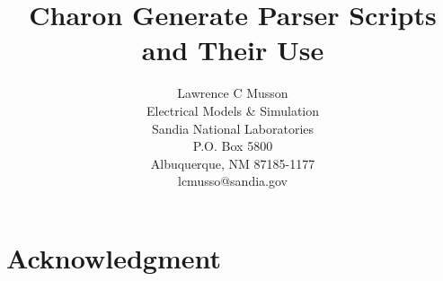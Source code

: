 \documentclass[12pt]{SANDreport}
\title{Charon Generate Parser Scripts and Their Use}
\author{Lawrence C Musson \\
	  Electrical Models \& Simulation \\
	  Sandia National Laboratories\\
	  P.O. Box 5800\\
	  Albuquerque, NM 87185-1177 \\
	  lcmusso@sandia.gov \\
	 }
\date{}
\begin{document}
    \maketitle

    \begin{abstract}
	
    \end{abstract}


    \clearpage
    \section*{Acknowledgment}
	


    \cleardoublepage		%
    \tableofcontents
    \listoffigures
    \listoftables




\end{document}

